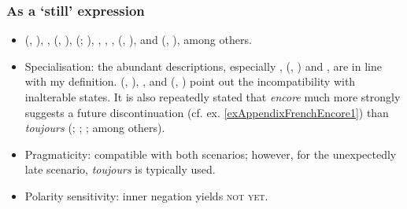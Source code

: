 \subsubsection{As a \lq{}still\rq{ }expression}
\begin{itemize}
	\item {} (\citeyear{vanderAuwera1991BeyondDuality}, \citeyear{vanderAuwera1998}), \textcite{Borillo1984},
	\citeauthor{Fuchs1988} (\citeyear{Fuchs1988}, \citeyear{Fuchs1993}), \citeauthor{MosegaardHansen2002} (\citeyear{MosegaardHansen2002}; \citeyear[135, 144–148]{MosegaardHansen2008}), \textcite{HoepelmanRohrer1980}, \textcite{Koenig1977}, \textcite{Martin1980}, \citeauthor{Muller1975} (\citeyear{Muller1975}, \citeyear{Muller1991}), \textcite{Nef1981} and 
	\citeauthor{VictorriFuchs1992} (\citeyear{VictorriFuchs1992}, \citeyear{VictorriFuchs1996}), among others.
	\item Specialisation: the abundant descriptions, especially \textcite{vanderAuwera1998}, \citeauthor{Muller1975} (\citeyear{Muller1975}, \citeyear{Muller1991}) and \textcite{MosegaardHansen2008}, are in line with my definition. \citeauthor{MosegaardHansen2002} (\citeyear{MosegaardHansen2002}, \citeyear[145]{MosegaardHansen2008}), \textcite{HoepelmanRohrer1980}, \textcite{Martin1980} and \citeauthor{Muller1975} (\citeyear{Muller1975}, \citeyear{Muller1991}) point out the incompatibility with inalterable states. It is also repeatedly stated that \textit{encore} much more strongly suggests a future discontinuation (cf. ex. \ref{exAppendixFrenchEncore1}) than \textit{toujours} (\cite{Fuchs1988}; \cite[149–150]{MosegaardHansen2008}; \cite{Muller1991}; among others).
	\item Pragmaticity: compatible with both scenarios; however, for the unexpectedly late scenario, \textit{toujours} is typically used.
	\item Polarity sensitivity: inner negation yields \textsc{not yet}.
\end{itemize}
	
